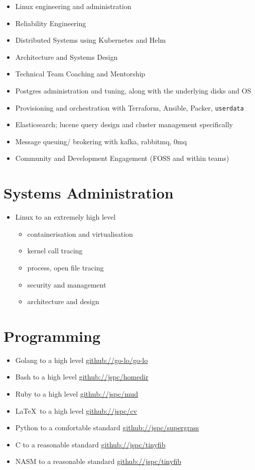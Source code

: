 \documentclass[11pt,a4paper,sans]{article}
\begin{document}
\begin{itemize}
\item Linux engineering and administration
\item Reliability Engineering
\item Distributed Systems using Kubernetes and Helm
\item Architecture and Systems Design
\item Technical Team Coaching and Mentorship
\item Postgres administration and tuning, along with the underlying disks and OS
\item Provisioning and orchestration with Terraform, Ansible, Packer, \texttt{userdata}
\item Elasticsearch; lucene query design and cluster management specifically
\item Message queuing/ brokering with kafka, rabbitmq, 0mq
\item Community and Development Engagement (FOSS and within teams)
\end{itemize}

\section{Systems Administration}

\begin{itemize}
\item Linux to an extremely high level
  \begin{itemize}
  \item containerisation and virtualisation
  \item kernel call tracing
  \item process, open file tracing
  \item security and management
  \item architecture and design
  \end{itemize}
\end{itemize}

\section{Programming}

\begin{itemize}
\item Golang to a high level \href{https://github.com/go-lo/go-lo}{github://go-lo/go-lo}
\item Bash to a high level \href{https://github.com/jspc/homedir}{github://jspc/homedir}
\item Ruby to a high level \href{https://github.com/jspc/mud}{github://jspc/mud}
\item \LaTeX \ to a high level \href{https://github.com/jspc/cv}{github://jspc/cv}
\item Python to a comfortable standard \href{https://github.com/jspc/supergrass}{github://jspc/supergrass}
\item C to a reasonable standard \href{https://github.com/jspc/tinyfib}{github://jspc/tinyfib}
\item NASM to a reasonable standard \href{https://github.com/jspc/tinyfib}{github://jspc/tinyfib}
\end{itemize}
\end{document}

